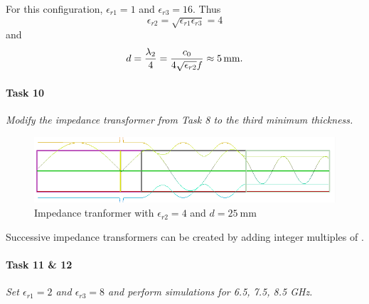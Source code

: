 For this configuration, $\epsilon_{r1} = 1$ and $\epsilon_{r3} = 16$. Thus
\begin{equation*}
	\epsilon_{r2} = \sqrt{\epsilon_{r1}\epsilon_{r3}} = 4
\end{equation*}
and
\begin{equation*}
	d = {\lambda_2 \over 4} = {c_0 \over 4 \sqrt{\epsilon_{r2}} f} \approx \SI{5}{\milli\meter}.
\end{equation*}

\paragraph{Task 10} \textit{Modify the impedance transformer from Task 8 to the third minimum thickness.}

\begin{figure}[tbph]
	\centering
	\includegraphics[width=0.95\linewidth]{graphics/Task3-10-Standing_25mm}
	\caption{Impedance tranformer with $\epsilon_{r2} = 4$ and $d = \SI{25}{\milli\meter}$}
	\label{fig:Task3-8-Standing_25mm}
\end{figure}

Successive impedance transformers can be created by adding integer multiples of .

\pagebreak
\paragraph{Task 11 \& 12} \textit{Set $\epsilon_{r1} = 2$ and $\epsilon_{r3} = 8$ and perform simulations for 6.5, 7.5, 8.5 GHz.}

